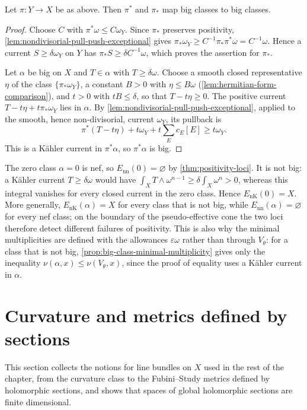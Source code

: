 \begin{proposition}\label{prop:big-classes-under-modifications}
Let $\pi\colon Y\to X$ be as above. Then $\pi^*$ and $\pi_*$ map big classes to big classes.
\end{proposition}
\begin{proof}
Choose $C$ with $\pi^*\omega\leq C\omega_Y$. Since $\pi_*$ preserves positivity, \cref{lem:nondivisorial-pull-push-exceptional} gives $\pi_*\omega_Y\geq C^{-1}\pi_*\pi^*\omega=C^{-1}\omega$. Hence a current $S\geq\delta\omega_Y$ on $Y$ has $\pi_*S\geq\delta C^{-1}\omega$, which proves the assertion for $\pi_*$.

Let $\alpha$ be big on $X$ and $T\in\alpha$ with $T\geq\delta\omega$. Choose a smooth closed representative $\eta$ of the class $\{\pi_*\omega_Y\}$, a constant $B>0$ with $\eta\leq B\omega$ (\cref{lem:hermitian-form-comparison}), and $t>0$ with $tB\leq\delta$, so that $T-t\eta\geq0$. The positive current $T-t\eta+t\pi_*\omega_Y$ lies in $\alpha$. By \cref{lem:nondivisorial-pull-push-exceptional}, applied to the smooth, hence non-divisorial, current $\omega_Y$, its pullback is
\[
 \pi^*(T-t\eta)+t\omega_Y+t\sum_E c_E[E]\geq t\omega_Y.
\]
This is a K\"ahler current in $\pi^*\alpha$, so $\pi^*\alpha$ is big.
\end{proof}

\begin{example}\label{ex:nef-boundary-minimal-current}
The zero class $\alpha=0$ is nef, so $E_{\mathrm{nn}}(0)=\varnothing$ by \cref{thm:positivity-loci}. It is not big: a K\"ahler current $T\geq\delta\omega$ would have $\int_XT\wedge\omega^{n-1}\geq\delta\int_X\omega^n>0$, whereas this integral vanishes for every closed current in the zero class. Hence $E_{\mathrm{nK}}(0)=X$. More generally, $E_{\mathrm{nK}}(\alpha)=X$ for every class that is not big, while $E_{\mathrm{nn}}(\alpha)=\varnothing$ for every nef class; on the boundary of the pseudo-effective cone the two loci therefore detect different failures of positivity. This is also why the minimal multiplicities are defined with the allowances $\varepsilon\omega$ rather than through $V_\theta$: for a class that is not big, \cref{prop:big-class-minimal-multiplicity} gives only the inequality $\nu(\alpha,x)\leq\nu(V_\theta,x)$, since the proof of equality uses a K\"ahler current in $\alpha$.
\end{example}

\section{Curvature and metrics defined by sections}
\label{sec:global-line-bundle-metrics}
This section collects the notions for line bundles on $X$ used in the rest of the chapter, from the curvature class to the Fubini--Study metrics defined by holomorphic sections, and shows that spaces of global holomorphic sections are finite dimensional.

